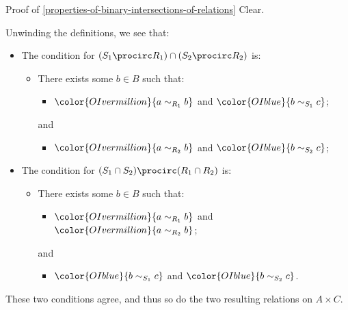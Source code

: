 \begin{Proof}{Proof of \cref{properties-of-binary-intersections-of-relations}}%
    Clear.

    Unwinding the definitions, we see that:
    \begin{itemize}
        \item The condition for $(S_{1}\procirc R_{1})\cap(S_{2}\procirc R_{2})$ is:
            \begin{itemize}
                \item There exists some $b\in B$ such that:
                    \begin{itemize}
                        \item $\color{OIvermillion}{a\sim_{R_{1}}b}$ and $\color{OIblue}{b\sim_{S_{1}}c}$;
                    \end{itemize}
                    and
                    \begin{itemize}\setcounter{enumi}{2}
                        \item $\color{OIvermillion}{a\sim_{R_{2}}b}$ and $\color{OIblue}{b\sim_{S_{2}}c}$;
                    \end{itemize}
            \end{itemize}
        \item The condition for $(S_{1}\cap S_{2})\procirc(R_{1}\cap R_{2})$ is:
            \begin{itemize}
                \item There exists some $b\in B$ such that:
                    \begin{itemize}
                        \item $\color{OIvermillion}{a\sim_{R_{1}}b}$ and $\color{OIvermillion}{a\sim_{R_{2}}b}$;
                    \end{itemize}
                    and
                    \begin{itemize}\setcounter{enumi}{2}
                        \item $\color{OIblue}{b\sim_{S_{1}}c}$ and $\color{OIblue}{b\sim_{S_{2}}c}$.
                    \end{itemize}
            \end{itemize}
    \end{itemize}
    These two conditions agree, and thus so do the two resulting relations on $A\times C$.
\end{Proof}
